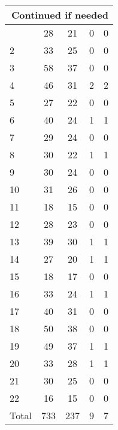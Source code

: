 \begin{center}
\begin{longtable}{l|c|c|c|c}
\hline \multicolumn{5}{|r|}{{Continued if needed}} \\ \hline
\endfoot 
1 & 28 & 21 & 0 & 0\\ \hline
2 & 33 & 25 & 0 & 0\\ \hline
3 & 58 & 37 & 0 & 0\\ \hline
4 & 46 & 31 & 2 & 2\\ \hline
5 & 27 & 22 & 0 & 0\\ \hline
6 & 40 & 24 & 1 & 1\\ \hline
7 & 29 & 24 & 0 & 0\\ \hline
8 & 30 & 22 & 1 & 1\\ \hline
9 & 30 & 24 & 0 & 0\\ \hline
10 & 31 & 26 & 0 & 0\\ \hline
11 & 18 & 15 & 0 & 0\\ \hline
12 & 28 & 23 & 0 & 0\\ \hline
13 & 39 & 30 & 1 & 1\\ \hline
14 & 27 & 20 & 1 & 1\\ \hline
15 & 18 & 17 & 0 & 0\\ \hline
16 & 33 & 24 & 1 & 1\\ \hline
17 & 40 & 31 & 0 & 0\\ \hline
18 & 50 & 38 & 0 & 0\\ \hline
19 & 49 & 37 & 1 & 1\\ \hline
20 & 33 & 28 & 1 & 1\\ \hline
21 & 30 & 25 & 0 & 0\\ \hline
22 & 16 & 15 & 0 & 0\\ \hline
\hline \hline
Total & 733 & 237 & 9 & 7



\end{longtable}
\end{center}

 
